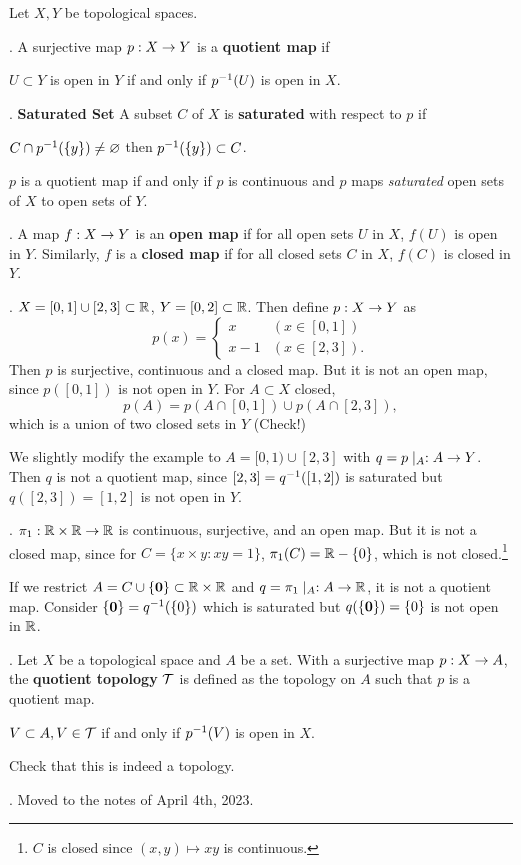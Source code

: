 Let \(X, Y\) be topological spaces.

.  A surjective map \(p : X \ra Y\) is a \textbf{quotient map} if
\begin{center}
    \(U \subset Y\) is open in \(Y\) if and only if \(p\inv(U)\) is open in \(X\).
\end{center}

. \textbf{Saturated Set} A subset \(C\) of \(X\) is \textbf{saturated} with respect to \(p\) if
\begin{center}
    \(C \cap p\inv(\{y\}) \neq \varnothing\) then \(p\inv(\{y\}) \subset C\).
\end{center}

\rmk \(p\) is a quotient map if and only if \(p\) is continuous and \(p\) maps \textit{saturated} open sets of \(X\) to open sets of \(Y\).

. A map \(f : X \ra Y\) is an \textbf{open map} if for all open sets \(U\) in \(X\), \(f(U)\) is open in \(Y\). Similarly, \(f\) is a \textbf{closed map} if for all closed sets \(C\) in \(X\), \(f(C)\) is closed in \(Y\).

\ex. \(X = [0, 1] \cup [2, 3] \subset \R\), \(Y = [0, 2] \subset \R\). Then define \(p : X \ra Y\) as
\[
    p(x) = \begin{cases}
        x & (x \in [0, 1]) \\ x - 1 & (x \in [2, 3]).
    \end{cases}
\]
Then \(p\) is surjective, continuous and a closed map. But it is not an open map, since \(p([0, 1])\) is not open in \(Y\). For \(A \subset X\) closed,
\[
    p(A) = p(A \cap [0, 1]) \cup p(A \cap [2, 3]),
\]
which is a union of two closed sets in \(Y\) (Check!)

We slightly modify the example to \(A = [0, 1) \cup [2, 3]\) with \(q = p \mid_A : A \ra Y\). Then \(q\) is not a quotient map, since \([2, 3] = q\inv([1, 2])\) is saturated but \(q([2, 3]) = [1, 2]\) is not open in \(Y\).

\ex. \(\pi_1 : \R \times \R \ra \R\) is continuous, surjective, and an open map. But it is not a closed map, since for \(C = \{x \times y : xy = 1\}\), \(\pi_1(C) = \R \bs \{0\}\), which is not closed.\footnote{\(C\) is closed since \((x, y) \mapsto xy\) is continuous.}

If we restrict \(A = C \cup \{\bf{0}\} \subset \R \times \R\) and \(q = \pi_1 \mid_A : A \ra \R\), it is not a quotient map. Consider \(\{\bf{0}\} = q\inv(\{0\})\) which is saturated but \(q(\{\bf{0}\}) = \{0\}\) is not open in \(\R\).

. Let \(X\) be a topological space and \(A\) be a set. With a surjective map \(p : X \ra A\), the \textbf{quotient topology} \(\mc{T}\) is defined as the topology on \(A\) such that \(p\) is a quotient map.
\begin{center}
    \(V \subset A, V \in \mc{T}\) if and only if \(p\inv(V)\) is open in \(X\).
\end{center}

\rmk Check that this is indeed a topology.

\ex. Moved to the notes of April 4th, 2023.

\pagebreak
